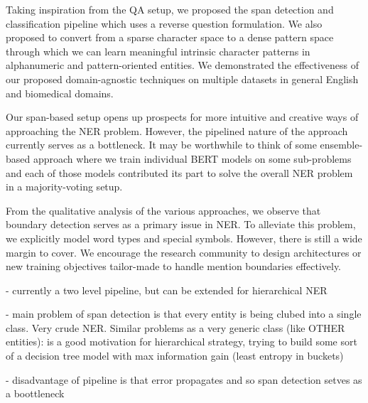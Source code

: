 Taking inspiration from the QA setup, we proposed the span detection and classification pipeline which uses a reverse question formulation. We also proposed to convert from a sparse character space to a dense pattern space through which we can learn meaningful intrinsic character patterns in alphanumeric and pattern-oriented entities. We demonstrated the effectiveness of our proposed domain-agnostic techniques on multiple datasets in general English and biomedical domains. 

Our span-based setup opens up prospects for more intuitive and creative ways of approaching the NER problem. However, the pipelined nature of the approach currently serves as a bottleneck. It may be worthwhile to think of some ensemble-based approach where we train individual BERT models on some sub-problems and each of those models contributed its part to solve the overall NER problem in a majority-voting setup.


From the qualitative analysis of the various approaches, we observe that boundary detection serves as a primary issue in NER. To alleviate this problem, we explicitly model word types and special symbols. However, there is still a wide margin to cover. We encourage the research community to design architectures or new training objectives tailor-made to handle mention boundaries effectively. 

- currently a two level pipeline, but can be extended for hierarchical NER

- main problem of span detection is that every entity is being clubed into a single class. Very crude NER. Similar problems as a very generic class (like OTHER entities): is a good motivation for hierarchical strategy, trying to build some sort of a decision tree model with max information gain (least entropy in buckets)

- disadvantage of pipeline is that error propagates and so span detection setves as a boottleneck